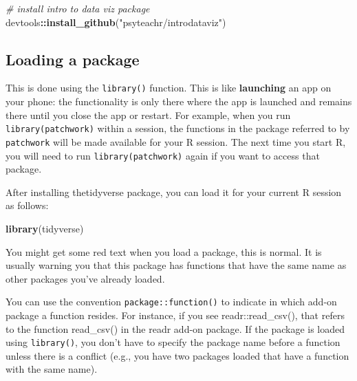 \documentclass[
  oneside]{book}
\newenvironment{Shaded}{\begin{snugshade}}{\end{snugshade}}
\newcommand{\CommentTok}[1]{\textcolor[rgb]{0.56,0.35,0.01}{\textit{#1}}}
\newcommand{\FunctionTok}[1]{\textcolor[rgb]{0.13,0.29,0.53}{\textbf{#1}}}
\newcommand{\NormalTok}[1]{#1}
\newcommand{\SpecialCharTok}[1]{\textcolor[rgb]{0.81,0.36,0.00}{\textbf{#1}}}
\newcommand{\StringTok}[1]{\textcolor[rgb]{0.31,0.60,0.02}{#1}}
\begin{document}
\begin{Shaded}
\begin{Highlighting}[]
\CommentTok{\# install intro to data viz package }
\NormalTok{devtools}\SpecialCharTok{::}\FunctionTok{install\_github}\NormalTok{(}\StringTok{"psyteachr/introdataviz"}\NormalTok{)}
\end{Highlighting}
\end{Shaded}

\subsection{Loading a package}\label{loading-a-package}

This is done using the \texttt{library()} function. This is like \textbf{launching} an app on your phone: the functionality is only there where the app is launched and remains there until you close the app or restart. For example, when you run \texttt{library(patchwork)} within a session, the functions in the package referred to by \texttt{patchwork} will be made available for your R session. The next time you start R, you will need to run \texttt{library(patchwork)} again if you want to access that package.

After installing thetidyverse package, you can load it for your current R session as follows:

\begin{Shaded}
\begin{Highlighting}[]
\FunctionTok{library}\NormalTok{(tidyverse)}
\end{Highlighting}
\end{Shaded}

You might get some red text when you load a package, this is normal. It is usually warning you that this package has functions that have the same name as other packages you've already loaded.

\begin{info}
You can use the convention \texttt{package::function()} to indicate in which add-on package a function resides. For instance, if you see {{readr}{::}{read\_csv}{(}{)}}, that refers to the function {{read\_csv}{(}{)}} in the readr add-on package. If the package is loaded using \texttt{library()}, you don't have to specify the package name before a function unless there is a conflict{} (e.g., you have two packages loaded that have a function with the same name).

\end{info}
\end{document}
